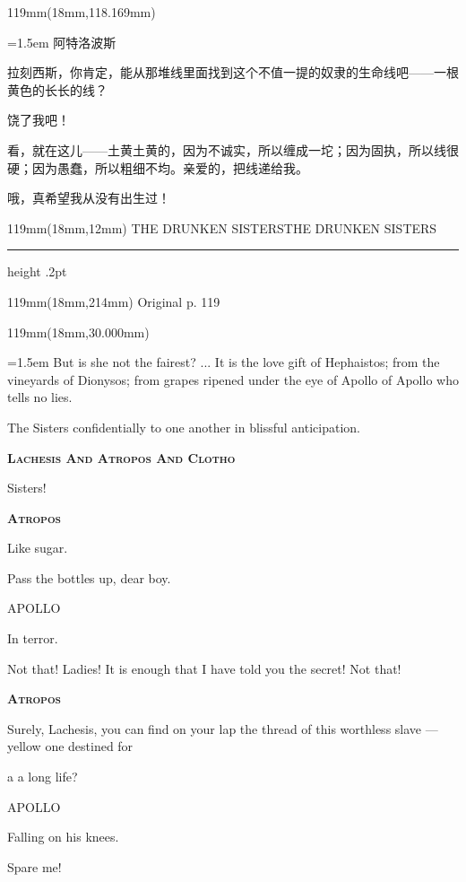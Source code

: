 \documentclass{article}
\newcommand{\ENsetup}{\normalfont\color{ink}\fontsize{11}{16.5}\selectfont\emergencystretch=1.5em}
\newcommand{\ZHsetup}{\normalfont\color{ink}\fontsize{10.5}{17}\selectfont\emergencystretch=1.5em}
\newcommand{\ENspeaker}[1]{{\fontsize{9.8}{13}\selectfont\scshape\bfseries #1}\par\vspace{3pt}}
\newcommand{\ZHspeaker}[1]{{\hei\fontsize{10.3}{13}\selectfont #1}\par\vspace{3pt}}
\newcommand{\Block}[3]{\begin{textblock*}{119mm}(18mm,#1mm){#2 #3\par}\end{textblock*}}
\newcommand{\Heading}[3]{%
  \begin{textblock*}{119mm}(18mm,12mm)
    \color{quiet}\fontsize{7.5}{10}\selectfont
    #1\hfill #2\par\vspace{3mm}\hrule height .2pt
  \end{textblock*}
  \begin{textblock*}{119mm}(18mm,214mm)
    \color{quiet}\fontsize{7}{10}\selectfont #3\hfill\thepage
  \end{textblock*}
}
\begin{document}
\Block{118.169}{\ZHsetup}{\ZHspeaker{阿特洛波斯}拉刻西斯，你肯定，能从那堆线里面找到这个不值一提的奴隶的生命线吧——一根黄色的长长的线？\par \vspace{2.2mm}\ZHspeaker{阿波罗}{\kai （跪在地上）}饶了我吧！\par \vspace{2.2mm}\ZHspeaker{阿特洛波斯}{\kai （对拉刻西斯）}看，就在这儿——土黄土黄的，因为不诚实，所以缠成一坨；因为固执，所以线很硬；因为愚蠢，所以粗细不均。亲爱的，把线递给我。\par \vspace{2.2mm}\ZHspeaker{阿波罗}{\kai （前额贴着地面）}哦，真希望我从没有出生过！\par }
\newpage
\null
\Heading{THE DRUNKEN SISTERS}{THE DRUNKEN SISTERS}{Original p. 119}
\Block{30.000}{\ENsetup}{\sloppy
But is she not the fairest? ... It is the love gift of Hephaistos; from the vineyards of Dionysos; from grapes ripened under the eye of Apollo of Apollo who tells no lies.\par\vspace{2pt}
The Sisters confidentially to one another in blissful anticipation.\par\vspace{2pt}
\ENspeaker{Lachesis And Atropos And Clotho}
Sisters!\par\vspace{2pt}
\ENspeaker{Atropos}
Like sugar.\par\vspace{2pt}
Pass the bottles up, dear boy.\par\vspace{2pt}
APOLLO\par\vspace{2pt}
In terror.\par\vspace{2pt}
Not that! Ladies! It is enough that I have told you the secret! Not that!\par\vspace{2pt}
\ENspeaker{Atropos}
Surely, Lachesis, you can find on your lap the thread of this worthless slave — yellow one destined for\par\vspace{2pt}
a a long life?\par\vspace{2pt}
APOLLO\par\vspace{2pt}
Falling on his knees.\par\vspace{2pt}
Spare me!\par\vspace{2pt}}
\end{document}
